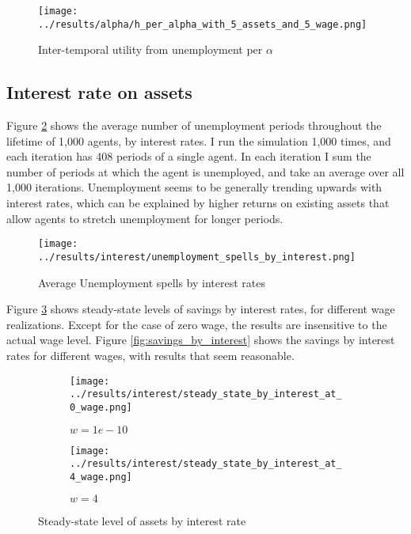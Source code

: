 \documentclass[12pt]{article}
\begin{document}
\begin{figure}[hbt!]
\centering
\texttt{[image: ../results/alpha/h\_per\_alpha\_with\_5\_assets\_and\_5\_wage.png]}
\caption{Inter-temporal utility from unemployment per $\alpha$}
\label{fig:h_per_alpha}
\end{figure}


\clearpage

\subsection{Interest rate on assets}

Figure \ref{fig:unemployment_spells_by_interest} shows the average number of unemployment periods throughout the lifetime of 1,000 agents, by interest rates. I run the simulation 1,000 times, and each iteration has 408 periods of a single agent. In each iteration I sum the number of periods at which the agent is unemployed, and take an average over all 1,000 iterations. Unemployment seems to be generally trending upwards with interest rates, which can be explained by higher returns on existing assets that allow agents to stretch unemployment for longer periods.

\begin{figure}[hbt!]
\centering
\texttt{[image: ../results/interest/unemployment\_spells\_by\_interest.png]}
\caption{Average Unemployment spells by interest rates}
\label{fig:unemployment_spells_by_interest}
\end{figure}

\vspace{5mm}
Figure \ref{fig:steady_state_by_interest} shows steady-state levels of savings by interest rates, for different wage realizations. Except for the case of zero wage, the results are insensitive to the actual wage level. Figure \ref{fig:savings_by_interest} shows the savings by interest rates for different wages, with results that seem reasonable.

\begin{figure}[hbt!]

\begin{subfigure}{0.5\textwidth}
\texttt{[image: ../results/interest/steady\_state\_by\_interest\_at\_0\_wage.png]} \caption{$w=1e-10$}
\end{subfigure}%
\begin{subfigure}{0.5\textwidth}
\texttt{[image: ../results/interest/steady\_state\_by\_interest\_at\_4\_wage.png]}
\caption{$w=4$}
\end{subfigure}

\caption{Steady-state level of assets by interest rate}
\label{fig:steady_state_by_interest}
\end{figure}
\end{document}
